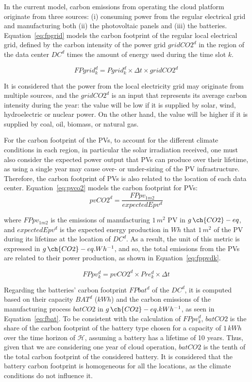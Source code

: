 In the current model, carbon emissions from operating the cloud platform originate from three sources: (i) consuming power from the regular electrical grid and manufacturing both (ii) the photovoltaic panels and (iii) the batteries. Equation~\eqref{eq:fpgrid} models the carbon footprint of the regular local electrical grid, defined by the carbon intensity of the power grid $gridCO2^d$ in the region of the data center $DC^d$  times the amount of energy used during the time slot $k$.

\begin{equation} \label{eq:fpgrid}
FPgrid_k^d = Pgrid_k^d\times \Delta t \times gridCO2^d
\end{equation}

It is considered that the power from the local electricity grid may originate from multiple sources, and the $gridCO2^d$ is an input that represents its average carbon intensity during the year: the value will be low if it is supplied by solar, wind, hydroelectric or nuclear power. On the other hand, the value will be higher if it is supplied by coal, oil, biomass, or natural gas.

For the carbon footprint of the PVs, to account for the different climate conditions in each region, in particular the solar irradiation received, one must also consider the expected power output that PVs can produce over their lifetime, as using a single year may cause over- or under-sizing of the PV infrastructure. Therefore, the carbon footprint of PVs is also related to the location of each data center. Equation~\eqref{eq:pvco2} models the carbon footprint for PVs:
\begin{equation} \label{eq:pvco2}
   pvCO2^d =  \frac{FPpv_{1m2}}{expectedEpv^d} 
\end{equation}

where $FPpv_{1m2}$ is the emissions of manufacturing $1\,m^2$ PV in $g\,\ch{CO2}-eq$, and $expectedEpv^d$ is the expected energy production in $Wh$ that $1\,m^2$ of the PV during its lifetime at the location of $DC^d$. As a result, the unit of this metric is expressed in $g\,\ch{CO2}-eq.Wh^{-1}$, and so, the total emissions from the PVs are related to their power production, as shown in Equation~\eqref{eq:fppvdk}.

\begin{equation} \label{eq:fppvdk}
   FPpv^d_k =  pvCO2^d \times Pre_k^d \times \Delta t
\end{equation}


Regarding the batteries' carbon footprint $FPbat^d$ of the $DC^d$, it is computed based on their capacity $BAT^d$ ($kWh$) and the carbon emissions of the manufacturing process $batCO2$ in $g\,\ch{CO2}-eq.kWh^{-1}$, as seen in Equation~\eqref{eq:fbat}. To be consistent with the calculation of $FPpv^d_k$, $batCO2$ is the share of the carbon footprint of the battery type chosen for a capacity of $1\,kWh$ over the time horizon of $\mathcal{H}$, assuming a battery has a lifetime of 10 years. Thus, given that we are considering one year of cloud operation, $batCO2$ is the tenth of the total carbon footprint of the considered battery. It is considered that the battery carbon footprint is homogeneous for all the locations, as the climate conditions do not influence it.

